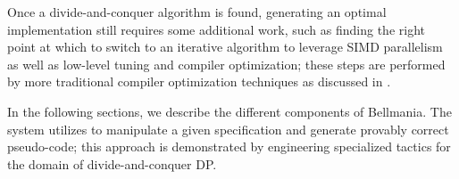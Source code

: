 Once a divide-and-conquer algorithm is found, generating an optimal implementation still requires some additional work, such as finding the right point at which to switch to an iterative algorithm to leverage SIMD parallelism as well as low-level tuning and compiler optimization;
these steps are performed by more traditional compiler optimization techniques
as discussed in .

In the following sections, we describe the different components of Bellmania. 
The system utilizes  to manipulate a given specification
and generate provably correct pseudo-code; 
this approach is demonstrated by engineering specialized tactics for the domain of divide-and-conquer DP.
